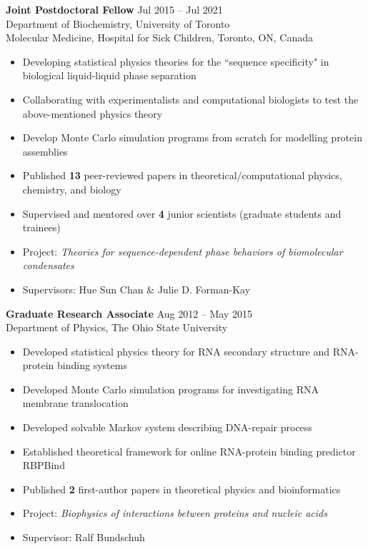 \documentclass[11pt]{../yhlcv}
\begin{document}
{\bf Joint Postdoctoral Fellow} \hfill Jul 2015 -- Jul 2021 \vspace{0.25em} \\
Department of Biochemistry, University of Toronto  \\ 
Molecular Medicine, Hospital for Sick Children, Toronto, ON, Canada
\vspace{-0.7em}\\
\begin{itemize}[leftmargin=*]\itemsep-0.2em
\item Developing statistical physics theories for the “sequence specificity" in biological liquid-liquid
phase separation
\item Collaborating with experimentalists and computational biologists to test the above-mentioned physics theory
\item Develop Monte Carlo simulation programs from scratch for modelling protein assemblies
\item Published {\bf 13} peer-reviewed papers in theoretical/computational physics, chemistry, and biology
\item Supervised and mentored over {\bf 4} junior scientists (graduate students and trainees)

\item[] Project: {\it Theories for sequence-dependent phase behaviors of biomolecular condensates}
\item[] Supervisors: Hue Sun Chan \& Julie D. Forman-Kay
\end{itemize} 

{\bf Graduate Research Associate} \hfill Aug 2012 -- May 2015 \vspace{0.25em} \\
Department of Physics, The Ohio State University
\vspace{-0.7em}\\
\begin{itemize}[leftmargin=*]\itemsep-0.2em
\item Developed statistical physics theory for RNA secondary structure and RNA-protein binding systems
\item Developed Monte Carlo simulation programs for investigating RNA membrane translocation
\item Developed solvable Markov system describing DNA-repair process
\item Established theoretical framework for online RNA-protein binding predictor RBPBind
\item Published {\bf 2} first-author papers in theoretical physics and bioinformatics
\item[] Project: {\it Biophysics of interactions between proteins and nucleic acids}
\item[] Supervisor: Ralf Bundschuh
\end{itemize}
\end{document}
